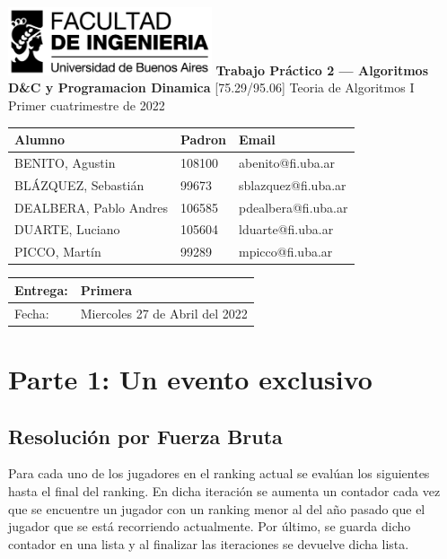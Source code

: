 \documentclass[titlepage,a4paper]{article}
\date{\today}
\title{}
\begin{document}
\begin{titlepage}
	\hfill\includegraphics[width=6cm]{assets/logofiuba.jpg}
    \centering
    \vfill
    \Huge \textbf{Trabajo Práctico 2 — Algoritmos D\&C y Programacion Dinamica}
    \vskip2cm
    \Large [75.29/95.06] Teoria de Algoritmos I\\
    Primer cuatrimestre de 2022\\
    \vfill
    \begin{tabular}{ | l | l | l | }
      \hline
      Alumno & Padron & Email \\ \hline
      BENITO, Agustin & 108100 & abenito@fi.uba.ar \\ \hline
      BLÁZQUEZ, Sebastián & 99673 & sblazquez@fi.uba.ar \\ \hline
      DEALBERA, Pablo Andres & 106585 & pdealbera@fi.uba.ar \\ \hline
      DUARTE, Luciano & 105604 & lduarte@fi.uba.ar \\ \hline
      PICCO, Martín & 99289 & mpicco@fi.uba.ar \\ \hline
  	\end{tabular}
    \vfill
    \begin{tabular}{ | l | l | }
      \hline
      Entrega: & Primera \\ \hline
      Fecha: & Miercoles 27 de Abril del 2022 \\ \hline
  	\end{tabular}
    \vfill
    \vfill
\end{titlepage}
\tableofcontents
\newpage
{}

\section{Parte 1: Un evento exclusivo}
\label{sec:org739ab92}
\subsection{Resolución por Fuerza Bruta}
\label{sec:orgf4881f2}

Para cada uno de los jugadores en el ranking actual se evalúan los siguientes hasta el final del ranking. En dicha iteración se aumenta un contador cada vez que se encuentre un jugador con un ranking menor al del año pasado que el jugador que se está recorriendo actualmente. Por último, se guarda dicho contador en una lista y al finalizar las iteraciones se devuelve dicha lista.
\end{document}
